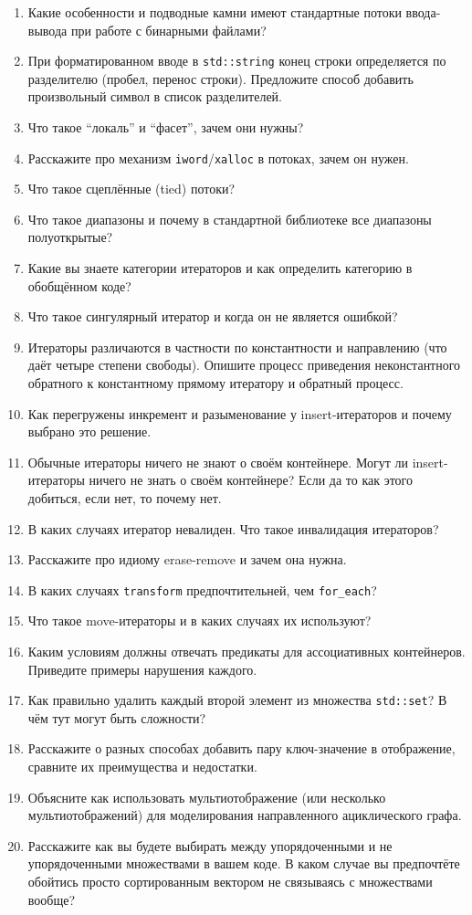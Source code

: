 \documentclass[a4paper,12pt,oneside]{book}
\begin{document}
\begin{enumerate}
\item Какие особенности и подводные камни имеют стандартные потоки ввода-вывода при работе с бинарными файлами?
\item При форматированном вводе в \lstinline!std::string! конец строки определяется по разделителю (пробел, перенос строки). Предложите способ добавить произвольный символ в список разделителей.
\item Что такое ``локаль'' и ``фасет'', зачем они нужны?
\item Расскажите про механизм \lstinline!iword!/\lstinline!xalloc! в потоках, зачем он нужен.
\item Что такое сцеплённые (tied) потоки?
%
%
\item Что такое диапазоны и почему в стандартной библиотеке все диапазоны полуоткрытые?
\item Какие вы знаете категории итераторов и как определить категорию в обобщённом коде?
\item Что такое сингулярный итератор и когда он не является ошибкой?
\item Итераторы различаются в частности по константности и направлению (что даёт четыре степени свободы). Опишите процесс приведения неконстантного обратного к константному прямому итератору и обратный процесс.
\item Как перегружены инкремент и разыменование у insert-итераторов и почему выбрано это решение.
\item Обычные итераторы ничего не знают о своём контейнере. Могут ли insert-итераторы ничего не знать о своём контейнере? Если да то как этого добиться, если нет, то почему нет.
\item В каких случаях итератор невалиден. Что такое инвалидация итераторов?
%
%
\item Расскажите про идиому erase-remove и зачем она нужна.
\item В каких случаях \lstinline!transform! предпочтительней, чем \lstinline!for_each!?
\item Что такое move-итераторы и в каких случаях их используют?
%
%
\item Каким условиям должны отвечать предикаты для ассоциативных контейнеров. Приведите примеры нарушения каждого.
\item Как правильно удалить каждый второй элемент из множества \lstinline!std::set!? В чём тут могут быть сложности?
\item Расскажите о разных способах добавить пару ключ-значение в отображение, сравните их преимущества и недостатки.
\item Объясните как использовать мультиотображение (или несколько мультиотображений) для моделирования направленного ациклического графа.
\item Расскажите как вы будете выбирать между упорядоченными и не упорядоченными множествами в вашем коде. В каком случае вы предпочтёте обойтись просто сортированным вектором не связываясь с множествами вообще?
\end{enumerate}
\end{document}
